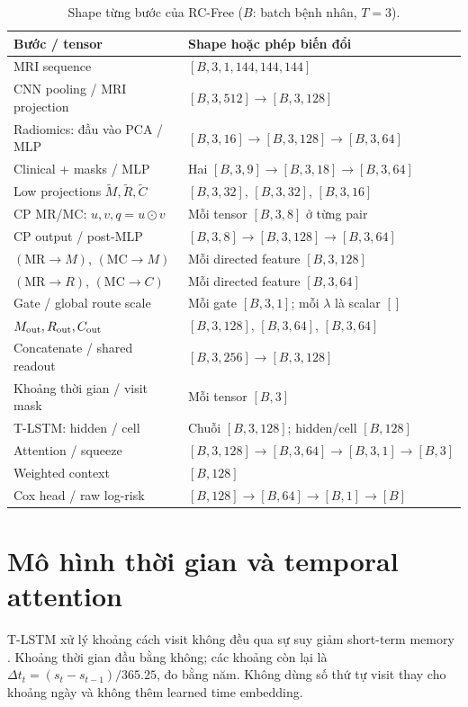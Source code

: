 \FloatBarrier
\begin{table}[H]
\centering
\small
\caption[Shape theo từng bước của kiến trúc RC-Free]{Shape từng bước của RC-Free ($B$: batch bệnh nhân, $T=3$).}
\label{tab:pipeline-shapes}
\begin{tabular*}{\textwidth}{@{\extracolsep{\fill}}ll@{}}
\toprule
\textbf{Bước / tensor} & \textbf{Shape hoặc phép biến đổi} \\
\midrule
MRI sequence & $[B,3,1,144,144,144]$ \\
CNN pooling / MRI projection & $[B,3,512]\to[B,3,128]$ \\
Radiomics: đầu vào PCA / MLP & $[B,3,16]\to[B,3,128]\to[B,3,64]$ \\
Clinical + masks / MLP & Hai $[B,3,9]\to[B,3,18]\to[B,3,64]$ \\
Low projections $\widetilde M,\widetilde R,\widetilde C$ & $[B,3,32]$, $[B,3,32]$, $[B,3,16]$ \\
CP MR/MC: $u,v,q=u\odot v$ & Mỗi tensor $[B,3,8]$ ở từng pair \\
CP output / post-MLP & $[B,3,8]\to[B,3,128]\to[B,3,64]$ \\
$(\mathrm{MR}\to M)$, $(\mathrm{MC}\to M)$ & Mỗi directed feature $[B,3,128]$ \\
$(\mathrm{MR}\to R)$, $(\mathrm{MC}\to C)$ & Mỗi directed feature $[B,3,64]$ \\
Gate / global route scale & Mỗi gate $[B,3,1]$; mỗi $\lambda$ là scalar $[]$ \\
$M_{\rm out},R_{\rm out},C_{\rm out}$ & $[B,3,128]$, $[B,3,64]$, $[B,3,64]$ \\
Concatenate / shared readout & $[B,3,256]\to[B,3,128]$ \\
Khoảng thời gian / visit mask & Mỗi tensor $[B,3]$ \\
T-LSTM: hidden / cell & Chuỗi $[B,3,128]$; hidden/cell $[B,128]$ \\
Attention / squeeze & $[B,3,128]\to[B,3,64]\to[B,3,1]\to[B,3]$ \\
Weighted context & $[B,128]$ \\
Cox head / raw log-risk & $[B,128]\to[B,64]\to[B,1]\to[B]$ \\
\bottomrule
\end{tabular*}
\end{table}

\section{Mô hình thời gian và temporal attention}
\label{sec:temporal-method}
T-LSTM xử lý khoảng cách visit không đều qua sự suy giảm short-term memory \cite{baytas2017patient,aghajanian2025longitudinal}. Khoảng thời gian đầu bằng không; các khoảng còn lại là $\Delta t_t=(s_t-s_{t-1})/365.25$, đo bằng năm. Không dùng số thứ tự visit thay cho khoảng ngày và không thêm learned time embedding.

